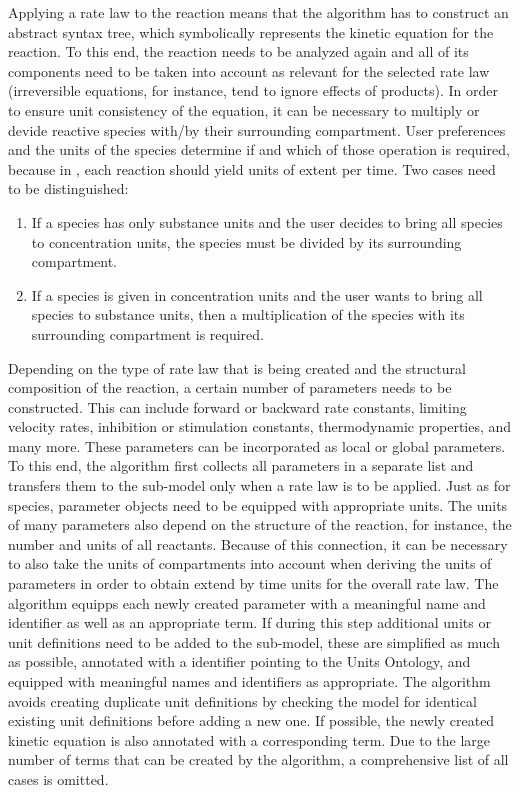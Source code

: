 Applying a rate law to the reaction means that the algorithm has to construct an abstract syntax tree, which symbolically represents the kinetic equation for the reaction.
To this end, the reaction needs to be analyzed again and all of its components need to be taken into account as relevant for the selected rate law (irreversible equations, for instance, tend to ignore effects of products).
In order to ensure unit consistency of the equation, it can be necessary to multiply or devide reactive species with/by their surrounding compartment.
User preferences and the units of the species determine if and which of those operation is required, because in \SBML, each reaction should yield units of extent per time.
Two cases need to be distinguished:
\begin{enumerate}
  \item If a species has only substance units and the user decides to bring all species to concentration units, the species must be divided by its surrounding compartment.
  \item If a species is given in concentration units and the user wants to bring all species to substance units, then a multiplication of the species with its surrounding compartment is required.
\end{enumerate}
Depending on the type of rate law that is being created and the structural composition of the reaction, a certain number of parameters needs to be constructed.
This can include forward or backward rate constants, limiting velocity rates, inhibition or stimulation constants, thermodynamic properties, and many more.
These parameters can be incorporated as local or global parameters.
To this end, the algorithm first collects all parameters in a separate list and transfers them to the sub-model only when a rate law is to be applied.
Just as for species, parameter objects need to be equipped with appropriate units.
The units of many parameters also depend on the structure of the reaction, for instance, the number and units of all reactants.
Because of this connection, it can be necessary to also take the units of compartments into account when deriving the units of parameters in order to obtain extend by time units for the overall rate law.
The algorithm equipps each newly created parameter with a meaningful name and identifier as well as an appropriate \SBO term.
If during this step additional units or unit definitions need to be added to the sub-model, these are simplified as much as possible, annotated with a \MIRIAM identifier pointing to the Units Ontology, and equipped with meaningful names and identifiers as appropriate.
The algorithm avoids creating duplicate unit definitions by checking the model for identical existing unit definitions before adding a new one.
If possible, the newly created kinetic equation is also annotated with a corresponding \SBO term.
Due to the large number of \SBO terms that can be created by the algorithm, a comprehensive list of all cases is omitted.

